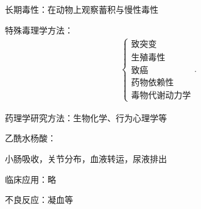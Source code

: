 长期毒性：在动物上观察蓄积与慢性毒性

特殊毒理学方法：
\begin{align*}
    \begin{cases}
        \text{致突变}\\
        \text{生殖毒性}\\
        \text{致癌}\\
        \text{药物依赖性}\\
        \text{毒物代谢动力学}
    \end{cases}
.\end{align*}

药理学研究方法：生物化学、行为心理学等

\begin{eg}
    乙酰水杨酸：

    小肠吸收，关节分布，血液转运，尿液排出

    临床应用：略

    不良反应：凝血等
\end{eg}

